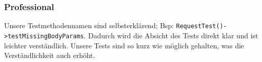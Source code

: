 \documentclass[12pt,a4paper,titlepage,ngerman,pdftex]{report}
\begin{document}
    \subsubsection{Professional}
    Unsere Testmethodennamen sind selbsterklärend; Bsp: \verb|RequestTest()->testMissingBodyParams|.
    Dadurch wird die Absicht des Tests direkt klar und ist leichter verständlich.
    Unsere Tests sind so kurz wie möglich gehalten, was die Verständlichkeit auch erhöht.
\end{document}
